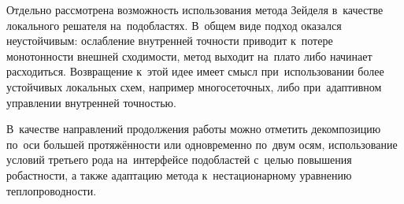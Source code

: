 Отдельно рассмотрена возможность использования метода Зейделя в~качестве
локального решателя на~подобластях. В~общем виде подход оказался
неустойчивым: ослабление внутренней точности приводит к~потере монотонности
внешней сходимости, метод выходит на~плато либо начинает расходиться.
Возвращение к~этой идее имеет смысл при~использовании более устойчивых
локальных схем, например многосеточных, либо при~адаптивном управлении
внутренней точностью.

В~качестве направлений продолжения работы можно отметить декомпозицию по~оси
большей протяжённости или одновременно по~двум осям, использование
условий третьего рода на~интерфейсе подобластей с~целью повышения
робастности, а также адаптацию метода к~нестационарному уравнению
теплопроводности.
